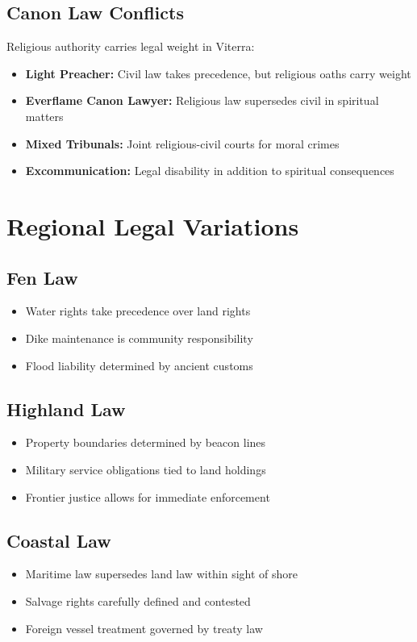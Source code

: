 \subsection*{Canon Law Conflicts}
Religious authority carries legal weight in Viterra:
\begin{itemize}
\item \textbf{Light Preacher:} Civil law takes precedence, but religious oaths carry weight
\item \textbf{Everflame Canon Lawyer:} Religious law supersedes civil in spiritual matters
\item \textbf{Mixed Tribunals:} Joint religious-civil courts for moral crimes
\item \textbf{Excommunication:} Legal disability in addition to spiritual consequences
\end{itemize}

\section*{Regional Legal Variations}

\subsection*{Fen Law}
\begin{itemize}
\item Water rights take precedence over land rights
\item Dike maintenance is community responsibility
\item Flood liability determined by ancient customs
\end{itemize}

\subsection*{Highland Law}
\begin{itemize}
\item Property boundaries determined by beacon lines
\item Military service obligations tied to land holdings
\item Frontier justice allows for immediate enforcement
\end{itemize}

\subsection*{Coastal Law}
\begin{itemize}
\item Maritime law supersedes land law within sight of shore
\item Salvage rights carefully defined and contested
\item Foreign vessel treatment governed by treaty law
\end{itemize}